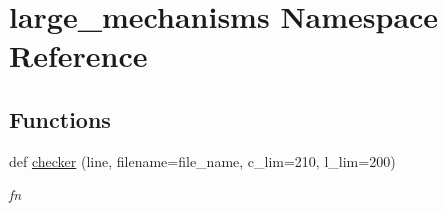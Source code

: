 \hypertarget{namespacelarge__mechanisms}{}\section{large\+\_\+mechanisms Namespace Reference}
\label{namespacelarge__mechanisms}
\subsection*{Functions}
\begin{DoxyCompactItemize}
\item 
\mbox{\label{namespacelarge__mechanisms_a0ddf139537a04e726bf373f07449b941}} 
def \mbox{\hyperlink{namespacelarge__mechanisms_a0ddf139537a04e726bf373f07449b941}{checker}} (line, filename=file\+\_\+name, c\+\_\+lim=210, l\+\_\+lim=200)
\begin{DoxyCompactList}\small\item\em fn \end{DoxyCompactList}\end{DoxyCompactItemize}
